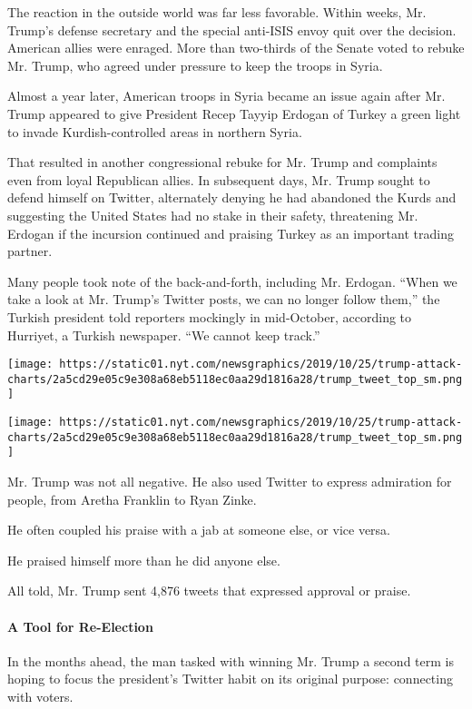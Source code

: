 The reaction in the outside world was far less favorable. Within weeks,
Mr. Trump's defense secretary and the special anti-ISIS envoy quit over
the decision. American allies were enraged. More than two-thirds of the
Senate voted to rebuke Mr. Trump, who agreed under pressure to keep the
troops in Syria.

Almost a year later, American troops in Syria became an issue again
after Mr. Trump appeared to give President Recep Tayyip Erdogan of
Turkey a green light to invade Kurdish-controlled areas in northern
Syria.

That resulted in another congressional rebuke for Mr. Trump and
complaints even from loyal Republican allies. In subsequent days, Mr.
Trump sought to defend himself on Twitter, alternately denying he had
abandoned the Kurds and suggesting the United States had no stake in
their safety, threatening Mr. Erdogan if the incursion continued and
praising Turkey as an important trading partner.

Many people took note of the back-and-forth, including Mr. Erdogan.
``When we take a look at Mr. Trump's Twitter posts, we can no longer
follow them,'' the Turkish president told reporters mockingly in
mid-October, according to Hurriyet, a Turkish newspaper. ``We cannot
keep track.''

\texttt{[image: https://static01.nyt.com/newsgraphics/2019/10/25/trump-attack-charts/2a5cd29e05c9e308a68eb5118ec0aa29d1816a28/trump\_tweet\_top\_sm.png]}

\texttt{[image: https://static01.nyt.com/newsgraphics/2019/10/25/trump-attack-charts/2a5cd29e05c9e308a68eb5118ec0aa29d1816a28/trump\_tweet\_top\_sm.png]}

Mr. Trump was not all negative. He also used Twitter to express
admiration for people, from Aretha Franklin to Ryan Zinke.

He often coupled his praise with a jab at someone else, or vice versa.

He praised himself more than he did anyone else.

All told, Mr. Trump sent 4,876 tweets that expressed approval or praise.

\hypertarget{a-tool-for-re-election}{%
\paragraph{A Tool for Re-Election}\label{a-tool-for-re-election}}

In the months ahead, the man tasked with winning Mr. Trump a second term
is hoping to focus the president's Twitter habit on its original
purpose: connecting with voters.


